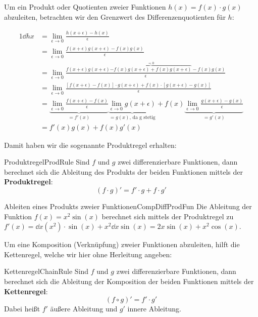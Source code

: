 Um ein Produkt oder Quotienten zweier Funktionen $h(x) = f(x) \cdot g(x)$ abzuleiten, betrachten wir den Grenzwert des Differenzenquotienten für $h$:

\begin{alignat*}{1}
    \dd{h}{x} &= \lim\limits_{\epsilon\to 0} \frac{h(x+\epsilon)-h(x)}{\epsilon} \\
              &= \lim\limits_{\epsilon \to 0} \frac{f(x+\epsilon)g(x+\epsilon)-f(x)g(x)}{\epsilon} \\
               &= \lim\limits_{\epsilon \to 0} \frac{f(x+\epsilon)g(x+\epsilon) \overbrace{-f(x)g(x+\epsilon) + f(x)g(x+\epsilon)}^{=0} - f(x)g(x)}{\epsilon} \\
               &= \lim\limits_{\epsilon \to 0} \frac{[f(x+\epsilon)-f(x)]\cdot g(x+\epsilon) + f(x) \cdot [g(x+\epsilon) - g(x)]}{\epsilon} \\
               &= \underbrace{\lim\limits_{\epsilon \to 0} \frac{f(x+\epsilon)-f(x)}{\epsilon}}_{=f'(x)} \underbrace{\lim\limits_{\epsilon\to 0} g(x+\epsilon)}_{=g(x)\text{, da g stetig}} + f(x) \underbrace{\lim\limits_{\epsilon \to 0} \frac{g(x+\epsilon)-g(x)}{\epsilon}}_{=g'(x)} \\
               &= f'(x)g(x) + f(x) g'(x)
\end{alignat*}

Damit haben wir die sogenannte Produktregel erhalten:

\begin{statement}{Produktregel}{ProdRule}
    Sind $f$ und $g$ zwei differenzierbare Funktionen, dann berechnet sich die Ableitung des Produkts der beiden Funktionen mittels der \textbf{Produktregel}:
    $$
        (f \cdot g)' = f' \cdot g + f \cdot g'
    $$
\end{statement}

\begin{example}{Ableiten eines Produkts zweier Funktionen}{CompDiffProdFun}
    Die Ableitung der Funktion $f(x) = x^2 \sin(x)$ berechnet sich mittels der Produktregel zu $f'(x) = \dd{}{x} (x^2) \cdot  \sin(x) + x^2 \dd{}{x} \sin(x) = 2x\sin(x) + x^2\cos(x)$.
\end{example}

Um eine Komposition (Verknüpfung) zweier Funktionen abzuleiten, hilft die Kettenregel, welche wir hier ohne Herleitung angeben:

\begin{statement}{Kettenregel}{ChainRule}
    Sind $f$ und $g$ zwei differenzierbare Funktionen, dann berechnet sich die Ableitung der Komposition der beiden Funktionen mittels der \textbf{Kettenregel}:
    $$
        (f \circ g)' = f' \cdot g'
    $$
    Dabei heißt $f'$ äußere Ableitung und $g'$ innere Ableitung.
\end{statement}

